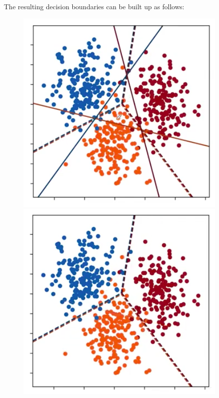 \begin{frameex}
\newpage
The resulting decision boundaries can be built up as follows:
\begin{figure}[H]
\centering
\includegraphics[scale=0.4]{decisionboundaries2.png}
\includegraphics[scale=0.4]{decisionboundaries3.png}
\end{figure}
\end{frameex}

